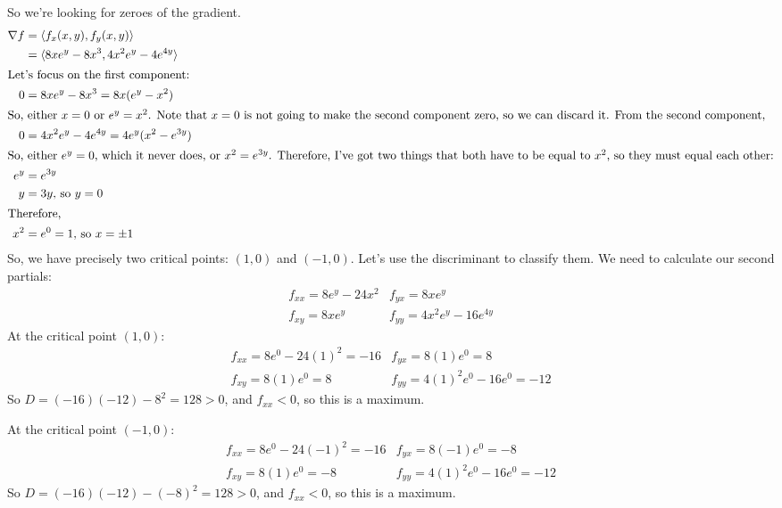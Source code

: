 \begin{enumerate}[leftmargin=0pt]
    \begin{red}
    So we're looking for zeroes of the gradient.
    \begin{align*}
        \nabla f &= \langle f_x(x, y), f_y(x,y) \rangle \\
        &= \langle 8x e^y - 8x^3, 4x^2 e^y - 4e^{4y} \rangle
        \\
        \intertext{Let's focus on the first component:}
        0 &= 8x e^y - 8x^3 = 8x(e^y - x^2) \\
        \intertext{So, either $x = 0$ or $e^y = x^2$. Note that $x=0$ is not going to make the second component zero, so we can discard it. From the second component,}
        0 &= 4x^2 e^y - 4e^{4y} = 4e^y (x^2 - e^{3y}) \\
        \intertext{So, either $e^y = 0$, which it never does, or $x^2 = e^{3y}$. Therefore, I've got two things that both have to be equal to $x^2$, so they must equal each other:}
        e^y &= e^{3y} \\
        y &= 3y \textrm{, so } y = 0 \\
        \intertext{Therefore, }
        x^2 &= e^0 = 1 \textrm{, so } x = \pm 1
    \end{align*}
    So, we have precisely two critical points: $(1, 0)$ and $(-1, 0)$. Let's use the discriminant to classify them. We need to calculate our second partials:
    \[
    \begin{array}{ll}
       f_{xx} = 8e^y-24x^2  & f_{yx} = 8xe^y \\
       f_{xy} = 8xe^y  & f_{yy} = 4x^2 e^y-16 e^{4y}
    \end{array}
    \]
    At the critical point $(1, 0)$:
    \[
    \begin{array}{ll}
        f_{xx} = 8e^0-24(1)^2 = -16 & f_{yx} = 8(1)e^0 = 8 \\
        f_{xy} = 8(1)e^0 = 8 & f_{yy} = 4(1)^2 e^0 - 16 e^0 = -12
    \end{array}
    \]
    So $D = (-16)(-12) - 8^2 = 128 > 0$, and $f_{xx} < 0$, so this is a maximum.
    
    At the critical point $(-1, 0)$:
    \[
    \begin{array}{ll}
        f_{xx} = 8e^0-24(-1)^2 = -16 & f_{yx} = 8(-1)e^0 = -8 \\
        f_{xy} = 8(1)e^0 = -8 & f_{yy} = 4(1)^2 e^0 - 16 e^0 = -12
    \end{array}
    \]
    So $D = (-16)(-12) - (-8)^2 = 128 > 0$, and $f_{xx} < 0$, so this is a maximum.
    \end{red}
    

\end{enumerate}
